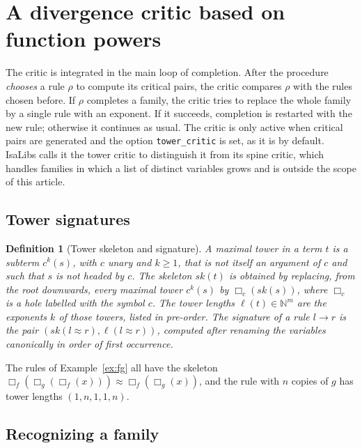 \documentclass[preprint,12pt]{elsarticle}
\newtheorem{definition}{Definition}
\newcommand{\rw}{\to}
\newcommand{\pw}[2]{#1^{#2}}               %
\newcommand{\isa}[1]{\texttt{#1}}
\newcommand{\sk}{\mathit{sk}}
\begin{document}
\section{A divergence critic based on function powers}
\label{sec:critic}

The critic is integrated in the main loop of completion. After the
procedure \emph{chooses} a rule $\rho$ to compute its critical pairs, the
critic compares $\rho$ with the rules chosen before. If $\rho$ completes a
family, the critic tries to replace the whole family by a single rule with
an exponent. If it succeeds, completion is restarted with the new rule;
otherwise it continues as usual. The critic is only active when critical
pairs are generated and the option \isa{tower\_critic} is set, as it is by
default. IsaLibs calls it the tower critic to distinguish it from its spine
critic, which handles families in which a list of distinct variables grows
and is outside the scope of this article.

\subsection{Tower signatures}

\begin{definition}[Tower skeleton and signature]
A \emph{maximal tower} in a term $t$ is a subterm $\pw{c}{k}(s)$, with $c$
unary and $k \ge 1$, that is not itself an argument of $c$ and such that $s$
is not headed by $c$. The \emph{skeleton} $\sk(t)$ is obtained by replacing,
from the root downwards, every maximal tower $\pw{c}{k}(s)$ by
$\Box_c(\sk(s))$, where $\Box_c$ is a hole labelled with the symbol $c$. The
\emph{tower lengths} $\ell(t) \in \mathbb{N}^m$ are the exponents $k$ of
those towers, listed in pre-order. The \emph{signature} of a rule
$l \rw r$ is the pair $(\sk(l \approx r), \ell(l \approx r))$, computed
after renaming the variables canonically in order of first occurrence.
\end{definition}

The rules of Example~\ref{ex:fg} all have the skeleton
$\Box_f(\Box_g(\Box_f(x))) \approx \Box_f(\Box_g(x))$, and the rule with
$n$ copies of $g$ has tower lengths $(1,n,1,1,n)$.

\subsection{Recognizing a family}
\end{document}
